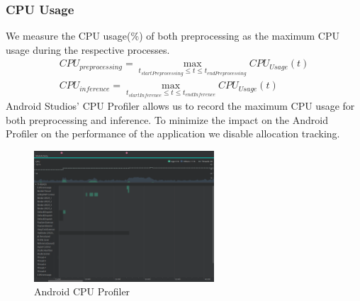 \subsubsection{CPU Usage}
We measure the CPU usage(\%) of both preprocessing as the maximum CPU usage during the respective processes.
\begin{equation*}
\begin{gathered}
CPU_{preprocessing} = \max\limits_{t_{startPreprocessing} \leq t \leq t_{endPreprocessing}} CPU_{Usage}(t)\\
CPU_{inference} = \max\limits_{t_{startInference} \leq t \leq t_{endInference}} CPU_{Usage}(t)
\end{gathered}
\end{equation*}
Android Studios’ CPU Profiler allows us to record the maximum CPU usage for both preprocessing and inference. To minimize the impact on the Android Profiler on the performance of the application we disable allocation tracking.
\begin{figure}[H]
\centering  
\includegraphics[width=0.6\textwidth]{./Bilder/profiler_CPU}
\caption{Android CPU Profiler}
\label{fig:prof_cpu}
\end{figure}
